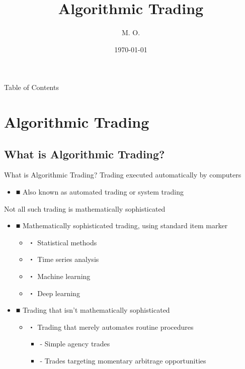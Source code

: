 \documentclass[dvipdfmx, autodetect-engine, aspectratio=169, 10.5pt]{beamer}
\title{Algorithmic Trading}
\author{M. O.}
\date{\today}
\begin{document}
\begin{frame}[plain]
	\titlepage
\end{frame}

\begin{frame}{Table of Contents}
	\tableofcontents
\end{frame}

\section{Algorithmic Trading}

\subsection{What is Algorithmic Trading?}

\begin{frame}{What is Algorithmic Trading?}
	Trading executed automatically by computers
	\begin{itemize}
		\item ■ Also known as automated trading or system trading
	\end{itemize}

	Not all such trading is mathematically sophisticated
	\begin{itemize}
		\item ■ Mathematically sophisticated trading, using standard item marker
		      \begin{itemize}
			      \item ・ Statistical methods
			      \item ・ Time series analysis
			      \item ・ Machine learning
			      \item ・ Deep learning
		      \end{itemize}
		\item ■ Trading that isn't mathematically sophisticated
		      \begin{itemize}
			      \item ・ Trading that merely automates routine procedures
			            \begin{itemize}
				            \item - Simple agency trades
				            \item - Trades targeting momentary arbitrage opportunities
			            \end{itemize}
		      \end{itemize}
	\end{itemize}

\end{frame}
\end{document}
